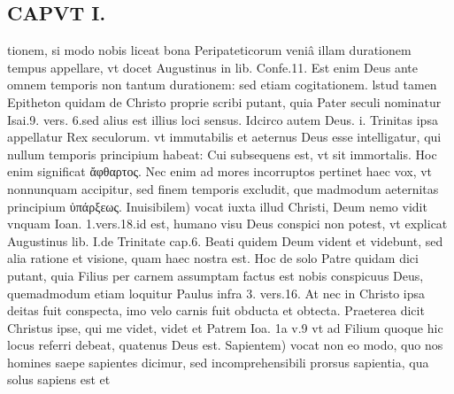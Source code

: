 \documentclass{article}
\begin{document}
\begin{pages}
\section*{CAPVT  I. }
\marginpar{[ p.31 ]}\pstart tionem, si modo nobis liceat bona Peripateticorum veniâ illam durationem tempus appellare, vt docet Augustinus in lib.  Confe.11. Est enim Deus ante omnem temporis non tantum durationem: sed etiam cogitationem. lstud tamen Epitheton quidam de Christo proprie scribi putant, quia Pater seculi nominatur Isai.9. vers. 6.sed alius est illius loci sensus. Idcirco autem Deus. i. Trinitas ipsa appellatur Rex seculorum. vt immutabilis et aeternus Deus esse intelligatur, qui nullum temporis principium habeat: Cui subsequens est, vt sit immortalis. Hoc enim significat ἄφθαρτος. Nec enim ad mores incorruptos pertinet haec vox, vt nonnunquam accipitur, sed finem temporis excludit, que madmodum aeternitas principium ὑπάρξεως. Inuisibilem) vocat iuxta illud Christi, Deum nemo vidit vnquam Ioan. 1.vers.18.id est, humano visu Deus conspici non potest, vt explicat Augustinus lib.  I.de Trinitate cap.6. Beati quidem Deum vident et videbunt, sed alia ratione et visione, quam haec nostra est. Hoc de solo Patre quidam dici putant, quia Filius per carnem assumptam factus est nobis conspicuus Deus, quemadmodum etiam loquitur Paulus infra 3. vers.16. At nec in Christo ipsa deitas fuit conspecta, imo velo carnis fuit obducta et obtecta. Praeterea dicit Christus ipse, qui me videt, videt et Patrem Ioa. 1a v.9 vt ad Filium quoque hic locus referri debeat, quatenus Deus est. Sapientem) vocat non eo modo, quo nos homines saepe sapientes dicimur, sed incomprehensibili prorsus sapientia, qua solus sapiens est et  \pend

\end{pages}
\end{document}
